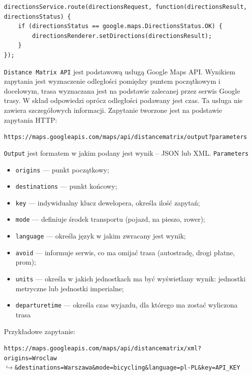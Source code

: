 \documentclass[eng,printmode,oneside]{mgr}
\begin{document}
\begin{lstlisting}[caption=Przykład wywołania
funkcji \texttt{route()},label=lst:DirectionsService]
directionsService.route(directionsRequest, function(directionsResult, directionsStatus) { 
	if (directionsStatus == google.maps.DirectionsStatus.OK) {
		directionsRenderer.setDirections(directionsResult);
	}
});
\end{lstlisting}

\texttt{Distance Matrix API} jest podstawową usługą Google Maps API. Wynikiem
zapytania jest wyznaczenie odległości pomiędzy puntem początkowym i docelowym,
trasa wyznaczana jest na podstawie zalecanej przez serwis Google trasy. W skład odpowiedzi oprócz
odległości podawany jest czas. Ta usługa nie zawiera szczegółowych informacji.
Zapytanie tworzone jest na podstawie zapytania HTTP:

\texttt{https://maps.googleapis.com/maps/api/distancematrix/output?parameters}

\texttt{Output} jest formatem w jakim podany jest wynik -- JSON lub XML.
\texttt{Parameters} 
\begin{itemize}
  \item \texttt{origins} --- punkt początkowy;
  \item \texttt{destinations} --- punkt końcowy;
  \item \texttt{key} --- indywidualny klucz dewelopera, określa ilość zapytań;
  \item \texttt{mode} --- definiuje środek transportu (pojazd, na pieszo, rower);
  \item \texttt{language} --- określa język w jakim zwracany jest wynik;
  \item \texttt{avoid} --- informuje serwis, co ma omijać trasa (autostradę,
  drogi płatne, prom);
  \item \texttt{units} --- określa w jakich jednostkach ma być wyświetlany wynik:
  jednostki metryczne lub jednostki imperialne;
  \item \texttt{departure\-time} --- określa czas wyjazdu, dla którego ma zostać
  wyliczona trasa
\end{itemize}

Przykładowe zapytanie:

\begin{flushright}
\texttt{https://maps.googleapis.com/maps/api/distancematrix/xml?origins=Wroclaw
\\$\hookrightarrow$\&destinations=Warszawa\&mode=bicycling\&language=pl-PL\&key=API\_KEY}
\end{flushright}
\end{document}
